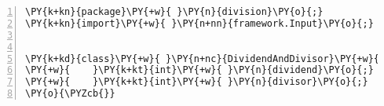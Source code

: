 \begin{Verbatim}[commandchars=\\\{\},numbers=left,firstnumber=1,stepnumber=1,frame=single,fontsize=\small]
\PY{k+kn}{package}\PY{+w}{ }\PY{n}{division}\PY{o}{;}
\PY{k+kn}{import}\PY{+w}{ }\PY{n+nn}{framework.Input}\PY{o}{;}


\PY{k+kd}{class}\PY{+w}{ }\PY{n+nc}{DividendAndDivisor}\PY{+w}{ }\PY{k+kd}{implements}\PY{+w}{ }\PY{n}{Input}\PY{+w}{ }\PY{o}{\PYZob{}}
\PY{+w}{    }\PY{k+kt}{int}\PY{+w}{ }\PY{n}{dividend}\PY{o}{;}
\PY{+w}{    }\PY{k+kt}{int}\PY{+w}{ }\PY{n}{divisor}\PY{o}{;}
\PY{o}{\PYZcb{}}
\end{Verbatim}
